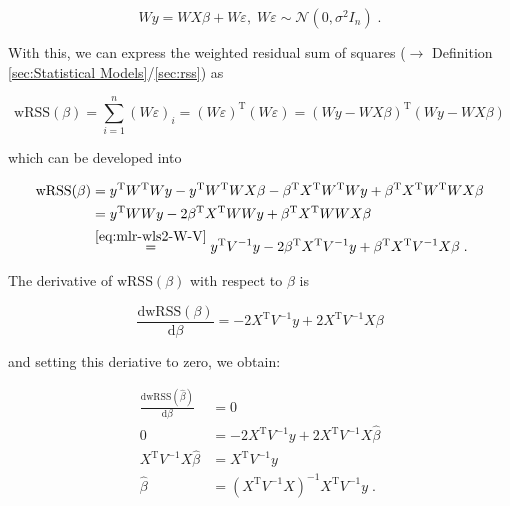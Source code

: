 \documentclass[a4paper,12pt,twoside]{book}
\begin{document}
\begin{equation} \label{eq:mlr-wls2-MLR-W-dev}
Wy = WX\beta + W\varepsilon, \; W\varepsilon \sim \mathcal{N}(0, \sigma^2 I_n) \; .
\end{equation}

With this, we can express the weighted residual sum of squares ($\rightarrow$ Definition \ref{sec:Statistical Models}/\ref{sec:rss}) as

\begin{equation} \label{eq:mlr-wls2-wRSS}
\mathrm{wRSS}(\beta) = \sum_{i=1}^n (W \varepsilon)_i = (W \varepsilon)^\mathrm{T} (W \varepsilon) = (Wy-WX\beta)^\mathrm{T} (Wy-WX\beta)
\end{equation}

which can be developed into

\begin{equation} \label{eq:mlr-wls2-wRSS-dev}
\begin{split}
\mathrm{wRSS}(\beta) &= y^\mathrm{T} W^\mathrm{T} W y - y^\mathrm{T} W^\mathrm{T} W X \beta - \beta^\mathrm{T} X^\mathrm{T} W^\mathrm{T} W y + \beta^\mathrm{T} X^\mathrm{T} W^\mathrm{T} W X \beta \\
&= y^\mathrm{T} W W y - 2 \beta^\mathrm{T} X^\mathrm{T} W W y + \beta^\mathrm{T} X^\mathrm{T} W W X \beta \\
&\overset{\eqref{eq:mlr-wls2-W-V}}{=} y^\mathrm{T} V^{-1} y - 2 \beta^\mathrm{T} X^\mathrm{T} V^{-1} y + \beta^\mathrm{T} X^\mathrm{T} V^{-1} X \beta \; .
\end{split}
\end{equation}

The derivative of $\mathrm{wRSS}(\beta)$ with respect to $\beta$ is

\begin{equation} \label{eq:mlr-wls2-wRSS-der}
\frac{\mathrm{d}\mathrm{wRSS}(\beta)}{\mathrm{d}\beta} = - 2 X^\mathrm{T} V^{-1} y + 2 X^\mathrm{T} V^{-1} X \beta
\end{equation}

and setting this deriative to zero, we obtain:

\begin{equation} \label{eq:mlr-wls2-WLS-qed}
\begin{split}
\frac{\mathrm{d}\mathrm{wRSS}(\hat{\beta})}{\mathrm{d}\beta} &= 0 \\
0 &= - 2 X^\mathrm{T} V^{-1} y + 2 X^\mathrm{T} V^{-1} X \hat{\beta} \\
X^\mathrm{T} V^{-1} X \hat{\beta} &= X^\mathrm{T} V^{-1} y \\
\hat{\beta} &= (X^\mathrm{T} V^{-1} X)^{-1} X^\mathrm{T} V^{-1} y \; .
\end{split}
\end{equation}
\end{document}
